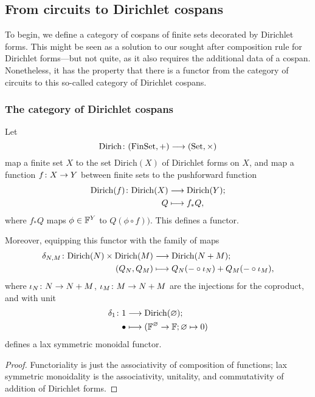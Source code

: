 \subsection{From circuits to Dirichlet cospans}
To begin, we define a category of cospans of finite sets decorated by Dirichlet
forms. This might be seen as a solution to our sought after composition rule for
Dirichlet forms---but not quite, as it also requires the additional data of a
cospan. Nonetheless, it has the property that there is a functor from the
category of circuits to this so-called category of Dirichlet cospans.

\subsubsection*{The category of Dirichlet cospans} 

\begin{proposition}
Let
\[
  \mathrm{Dirich}{\colon} (\mathrm{FinSet},+) \longrightarrow (\mathrm{Set},\times)
\]
map a finite set $X$ to the set $\mathrm{Dirich}(X)$ of Dirichlet forms on $X$,
and map a function $f{\colon} X \to Y$ between finite sets to the pushforward function
\begin{align*}
  \mathrm{Dirich}(f){\colon} \mathrm{Dirich}(X) &\longrightarrow \mathrm{Dirich}(Y); \\
  Q &\longmapsto f_{\ast}Q,
\end{align*}
where $f_\ast Q$ maps $\phi \in {\mathbb F}^Y$ to $Q(\phi \circ f))$. This defines a
functor.

Moreover, equipping this functor with the family of maps
\begin{align*}
  \delta_{N,M}{\colon} \mathrm{Dirich}(N) \times \mathrm{Dirich}(M) &\longrightarrow
  \mathrm{Dirich}(N+M);\\
  (Q_N,Q_M) &\longmapsto Q_N(-\circ \iota_N) +Q_M(-\circ \iota_M),
\end{align*}
where $\iota_N{\colon} N \to N+M$, $\iota_M{\colon} M \to N+M$ are the injections for
the coproduct, and with unit
\begin{align*}
  \delta_1{\colon} 1 &\longrightarrow \mathrm{Dirich}(\varnothing);\\
  \bullet &\longmapsto ({\mathbb F}^\varnothing \to {\mathbb F}; \varnothing \mapsto 0)
\end{align*}
defines a lax symmetric monoidal functor.
\end{proposition}

\begin{proof}
  Functoriality is just the associativity of composition of functions;
  lax symmetric monoidality is the associativity, unitality, and commutativity
  of addition of Dirichlet forms.
\end{proof}
  
